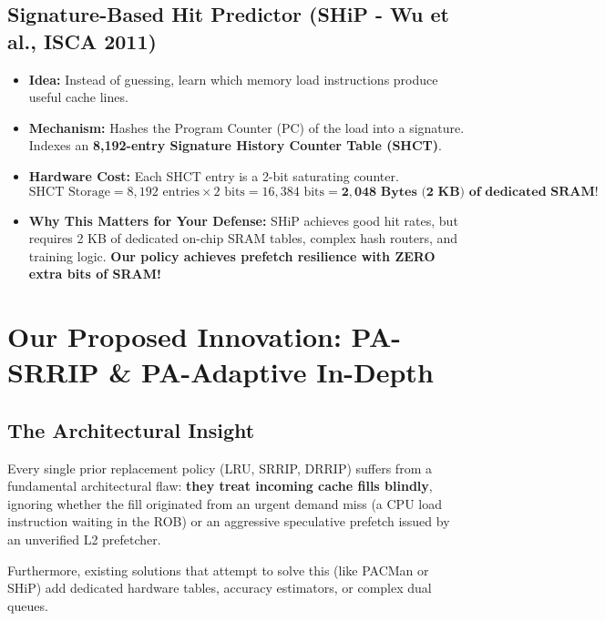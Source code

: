 \documentclass[11pt, a4paper]{article}
\begin{document}
\subsection{Signature-Based Hit Predictor (SHiP - Wu et al., ISCA 2011)}
\begin{itemize}[leftmargin=1.5em]
  \item \textbf{Idea:} Instead of guessing, learn which memory load instructions produce useful cache lines.
  \item \textbf{Mechanism:} Hashes the Program Counter (PC) of the load into a signature. Indexes an \textbf{8,192-entry Signature History Counter Table (SHCT)}.
  \item \textbf{Hardware Cost:} Each SHCT entry is a 2-bit saturating counter.
  \begin{equation}
    \text{SHCT Storage} = 8,192 \text{ entries} \times 2 \text{ bits} = 16,384 \text{ bits} = \mathbf{2,048 \text{ Bytes (2 KB) of dedicated SRAM!}}
  \end{equation}
  \item \textbf{Why This Matters for Your Defense:} SHiP achieves good hit rates, but requires 2 KB of dedicated on-chip SRAM tables, complex hash routers, and training logic. \textbf{Our policy achieves prefetch resilience with ZERO extra bits of SRAM!}
\end{itemize}

\newpage

\section{Our Proposed Innovation: PA-SRRIP \& PA-Adaptive In-Depth}

\subsection{The Architectural Insight}
Every single prior replacement policy (LRU, SRRIP, DRRIP) suffers from a fundamental architectural flaw: \textbf{they treat incoming cache fills blindly}, ignoring whether the fill originated from an urgent demand miss (a CPU load instruction waiting in the ROB) or an aggressive speculative prefetch issued by an unverified L2 prefetcher.

Furthermore, existing solutions that attempt to solve this (like PACMan or SHiP) add dedicated hardware tables, accuracy estimators, or complex dual queues.
\end{document}
